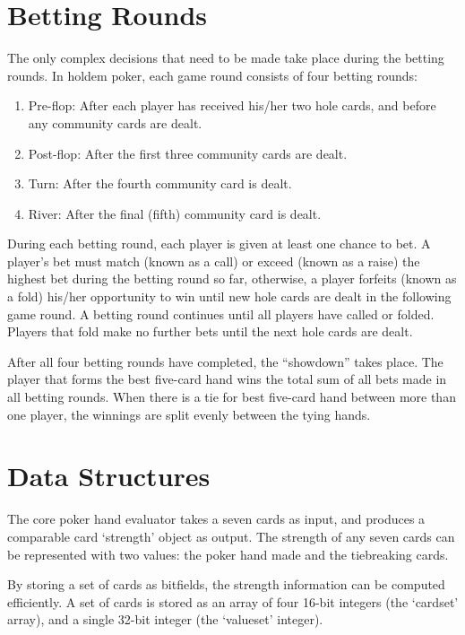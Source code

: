 \section{Betting Rounds}
\label{sec:BettingRounds}

The only complex decisions that need to be made take place during the betting rounds.
In holdem poker, each game round consists of four betting rounds:
\begin{enumerate}
\singlespacing
\item Pre-flop: After each player has received his/her two hole cards, and before any community cards are dealt.
\item Post-flop: After the first three community cards are dealt.
\item Turn: After the fourth community card is dealt.
\item River: After the final (fifth) community card is dealt.
\end{enumerate}

During each betting round, each player is given at least one chance to bet.
A player's bet must match (known as a call) or exceed (known as a raise) the highest bet during the betting round so far, otherwise, a player forfeits (known as a fold) his/her opportunity to win until new hole cards are dealt in the following game round.
A betting round continues until all players have called or folded.
Players that fold make no further bets until the next hole cards are dealt.

After all four betting rounds have completed, the ``showdown'' takes place.
The player that forms the best five-card hand wins the total sum of all bets made in all betting rounds.
When there is a tie for best five-card hand between more than one player, the winnings are split evenly between the tying hands.



\section{Data Structures}
\label{sec:DataStructures}

The core poker hand evaluator takes a seven cards as input, and produces a comparable card `strength' object as output.
The strength of any seven cards can be represented with two values: the poker hand made and the tiebreaking cards.

By storing a set of cards as bitfields, the strength information can be computed efficiently.
A set of cards is stored as an array of four 16-bit integers (the `cardset' array), and a single 32-bit integer (the `valueset' integer).

